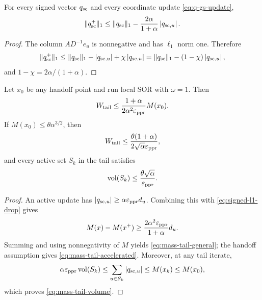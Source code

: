 \begin{lemma}[Signed weighted-$\ell_1$ decrease at $\omega=1$]
\label{lem:signed-l1}
For every signed vector $q_{\rm sc}$ and every coordinate update
\cref{eq:q-gs-update},
\begin{equation}
  \lVert q_{\rm sc}^+\rVert_1
  \leq
  \lVert q_{\rm sc}\rVert_1
  -\frac{2\alpha}{1+\alpha}\left\lvert q_{{\rm sc},u} \right\rvert.
  \label{eq:signed-l1-drop}
\end{equation}
\end{lemma}

\begin{proof}
The column $AD^{-1}e_u$ is nonnegative and has $\ell_1$ norm one.  Therefore
\[
  \lVert q_{\rm sc}^+\rVert_1
  \leq
  \lVert q_{\rm sc}\rVert_1-\left\lvert q_{{\rm sc},u} \right\rvert
  +\chi\left\lvert q_{{\rm sc},u} \right\rvert
  =\lVert q_{\rm sc}\rVert_1-(1-\chi)\left\lvert q_{{\rm sc},u} \right\rvert,
\]
and $1-\chi=2\alpha/(1+\alpha)$.
\end{proof}

\begin{theorem}
\label{thm:mass-tail}
Let $x_0$ be any handoff point and run local SOR with $\omega=1$.  Then
\begin{equation}
  W_{\rm tail}
  \leq
  \frac{1+\alpha}{2\alpha^2\varepsilon_{\mathrm{ppr}}}M(x_0).
  \label{eq:mass-tail-general}
\end{equation}
If $M(x_0)\leq\theta\alpha^{3/2}$, then
\begin{equation}
  W_{\rm tail}
  \leq
  \frac{\theta(1+\alpha)}{2\sqrt\alpha\varepsilon_{\mathrm{ppr}}},
  \label{eq:mass-tail-accelerated}
\end{equation}
and every active set $S_k$ in the tail satisfies
\begin{equation}
  \operatorname{vol}(S_k)
  \leq\frac{\theta\sqrt\alpha}{\varepsilon_{\mathrm{ppr}}}.
  \label{eq:mass-tail-volume}
\end{equation}
\end{theorem}

\begin{proof}
An active update has
$\left\lvert q_{{\rm sc},u} \right\rvert\geq\alpha\varepsilon_{\mathrm{ppr}} d_u$.  Combining this with
\cref{eq:signed-l1-drop} gives
\[
  M(x)-M(x^+)
  \geq\frac{2\alpha^2\varepsilon_{\mathrm{ppr}}}{1+\alpha}d_u.
\]
Summing and using nonnegativity of $M$ yields
\cref{eq:mass-tail-general}; the handoff assumption gives
\cref{eq:mass-tail-accelerated}.  Moreover, at any tail iterate,
\[
  \alpha\varepsilon_{\mathrm{ppr}}\operatorname{vol}(S_k)
  \leq\sum_{u\in S_k}\left\lvert q_{{\rm sc},u} \right\rvert
  \leq M(x_k)
  \leq M(x_0),
\]
which proves \cref{eq:mass-tail-volume}.
\end{proof}
